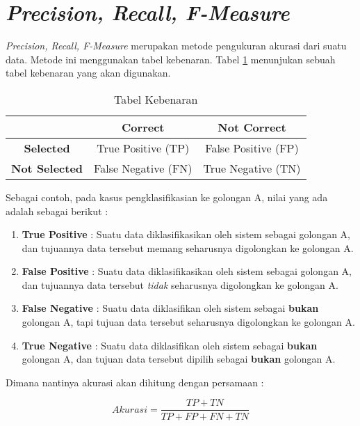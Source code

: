 \documentclass[../Proposal.tex]{subfiles}
\begin{document}
	\section{\textit{Precision, Recall, F-Measure}}
	\textit{Precision, Recall, F-Measure} merupakan metode pengukuran akurasi dari suatu data. Metode ini menggunakan tabel kebenaran\cite{fmeasure}. Tabel \ref{tabel-kebenaran} menunjukan sebuah tabel kebenaran yang akan digunakan.
	
	\begin{table}[h!]
		\centering
		\caption{Tabel Kebenaran}
		\begin{tabular}{ | c | c | c | }
			\hline
			& \textbf{Correct} & \textbf{Not Correct} \\ 
			\hline \textbf{Selected} & True Positive (TP) & False Positive (FP) \\  
			\hline \textbf{Not Selected} & False Negative (FN) & True Negative (TN) \\
			\hline
		\end{tabular}
		\label{tabel-kebenaran}
	\end{table}
	
	\noindent Sebagai contoh, pada kasus pengklasifikasian ke golongan A, nilai yang ada adalah sebagai berikut :
	
	\begin{enumerate}
		\item \textbf{True Positive} : Suatu data diklasifikasikan oleh sistem sebagai golongan A, dan tujuannya data tersebut memang seharusnya digolongkan ke golongan A.
		\item \textbf{False Positive} : Suatu data diklasifikasikan oleh sistem sebagai golongan A, dan tujuannya data tersebut \textit{tidak} seharusnya digolongkan ke golongan A.
		\item \textbf{False Negative} : Suatu data diklasifikan oleh sistem sebagai \textbf{bukan} golongan A, tapi tujuan data tersebut seharusnya digolongkan ke golongan A.
		\item \textbf{True Negative} : Suatu data diklasifikan oleh sistem sebagai \textbf{bukan} golongan A, dan tujuan data tersebut dipilih sebagai \textbf{bukan} golongan A.
	\end{enumerate}
	
	\noindent Dimana nantinya akurasi akan dihitung dengan persamaan : \\
	
	\begin{center}
		\centering
		\begin{equation}
		Akurasi = \frac{TP + TN}{TP + FP + FN + TN}
		\end{equation}
		\label{eq:akurasi}
	\end{center}
	
\end{document}
